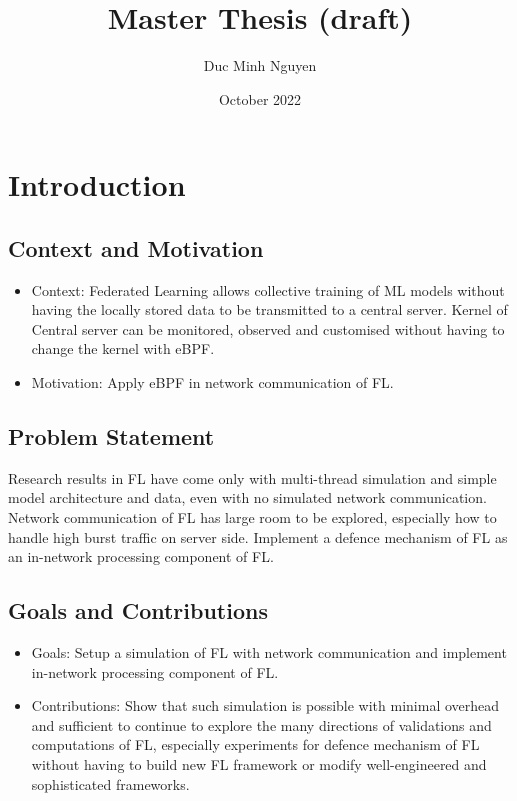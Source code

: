 \documentclass{article}
\title{Master Thesis (draft)}
\author{Duc Minh Nguyen}
\date{October 2022}
\begin{document}
\maketitle

\tableofcontents

\section{Introduction}
\subsection{Context and Motivation}
\begin{itemize}
    \item Context: Federated Learning allows collective training of ML models
    without having the locally stored data to be transmitted to a central
    server. Kernel of Central server can be monitored, observed and customised
    without having to change the kernel with eBPF.
    \item Motivation: Apply eBPF in network communication of FL.
\end{itemize}

\subsection{Problem Statement}
Research results in FL have come only with multi-thread simulation and simple
model architecture and data, even with no simulated network communication.
Network communication of FL has large room to be explored, especially how to
handle high burst traffic on server side. Implement a defence mechanism of FL
as an in-network processing component of FL.

\subsection{Goals and Contributions}
\begin{itemize}
    \item Goals: Setup a simulation of FL with network communication and
    implement in-network processing component of FL.
    \item Contributions: Show that such simulation is possible with minimal
    overhead and sufficient to continue to explore the many directions of
    validations and computations of FL, especially experiments for defence
    mechanism of FL without having to build new FL framework or modify
    well-engineered and sophisticated frameworks.
\end{itemize}
\end{document}
